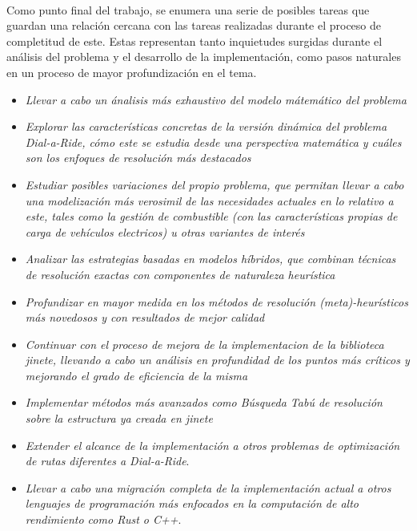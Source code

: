 \documentclass{subfiles}
\begin{document}
      \paragraph{}
      Como punto final del trabajo, se enumera una serie de posibles tareas que guardan una relación cercana con las tareas realizadas durante el proceso de completitud de este. Estas representan tanto inquietudes surgidas durante el análisis del problema y el desarrollo de la implementación, como pasos naturales en un proceso de mayor profundización en el tema.

      \begin{itemize}

        \item \emph{Llevar a cabo un ánalisis más exhaustivo del modelo mátemático del problema}

        \item \emph{Explorar las características concretas de la versión dinámica del problema Dial-a-Ride, cómo este se estudia desde una perspectiva matemática y cuáles son los enfoques de resolución más destacados}

        \item \emph{Estudiar posibles variaciones del propio problema, que permitan llevar a cabo una modelización más verosimil de las necesidades actuales en lo relativo a este, tales como la gestión de combustible (con las características propias de carga de vehículos electricos) u otras variantes de interés}

        \item \emph{Analizar las estrategias basadas en modelos híbridos, que combinan técnicas de resolución exactas con componentes de naturaleza heurística}

        \item \emph{Profundizar en mayor medida en los métodos de resolución (meta)-heurísticos más novedosos y con resultados de mejor calidad}

        \item \emph{Continuar con el proceso de mejora de la implementacion de la biblioteca \emph{jinete}, llevando a cabo un análisis en profundidad de los puntos más críticos y mejorando el grado de eficiencia de la misma}

        \item \emph{Implementar métodos más avanzados como \emph{Búsqueda Tabú} de resolución sobre la estructura ya creada en \emph{jinete}}

        \item \emph{Extender el alcance de la implementación a otros problemas de optimización de rutas diferentes a \emph{Dial-a-Ride}}.

        \item \emph{Llevar a cabo una migración completa de la implementación actual a otros lenguajes de programación más enfocados en la computación de alto rendimiento como \emph{Rust} o \emph{C++}}.

      \end{itemize}
\end{document}
